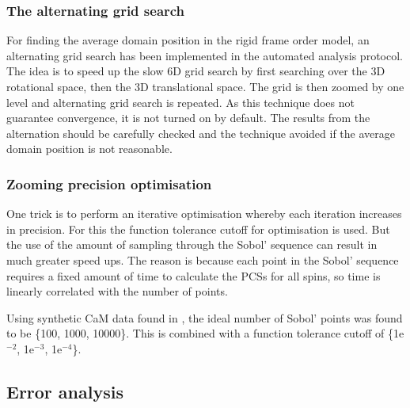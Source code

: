 

\subsubsection{The alternating grid search}

For finding the average domain position in the rigid frame order model, an alternating grid search has been implemented in the automated analysis protocol.
The idea is to speed up the slow 6D grid search by first searching over the 3D rotational space, then the 3D translational space.
The grid is then zoomed by one level and alternating grid search is repeated.
As this technique does not guarantee convergence, it is not turned on by default.
The results from the alternation should be carefully checked and the technique avoided if the average domain position is not reasonable.






\subsubsection{Zooming precision optimisation}

One trick is to perform an iterative optimisation whereby each iteration increases in precision.
For this the function tolerance cutoff for optimisation is used.
But the use of the amount of sampling through the Sobol' sequence can result in much greater speed ups.
The reason is because each point in the Sobol' sequence requires a fixed amount of time to calculate the PCSs for all spins, so time is linearly correlated with the number of points.

Using synthetic CaM data found in , the ideal number of Sobol' points was found to be \{100, 1000, 10000\}.
This is combined with a function tolerance cutoff of \{1e$^{-2}$, 1e$^{-3}$, 1e$^{-4}$\}.





\subsection{Error analysis}




